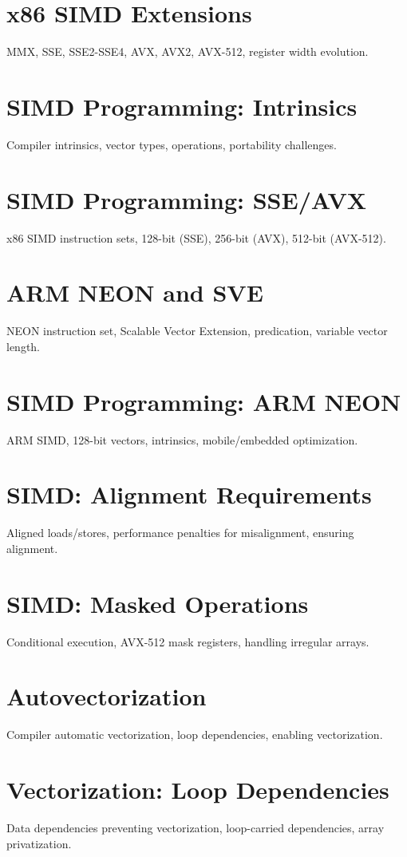 \chapter{x86 SIMD Extensions}
MMX, SSE, SSE2-SSE4, AVX, AVX2, AVX-512, register width evolution.

\chapter{SIMD Programming: Intrinsics}
Compiler intrinsics, vector types, operations, portability challenges.

\chapter{SIMD Programming: SSE/AVX}
x86 SIMD instruction sets, 128-bit (SSE), 256-bit (AVX), 512-bit (AVX-512).

\chapter{ARM NEON and SVE}
NEON instruction set, Scalable Vector Extension, predication, variable vector length.

\chapter{SIMD Programming: ARM NEON}
ARM SIMD, 128-bit vectors, intrinsics, mobile/embedded optimization.

\chapter{SIMD: Alignment Requirements}
Aligned loads/stores, performance penalties for misalignment, ensuring alignment.

\chapter{SIMD: Masked Operations}
Conditional execution, AVX-512 mask registers, handling irregular arrays.

\chapter{Autovectorization}
Compiler automatic vectorization, loop dependencies, enabling vectorization.

\chapter{Vectorization: Loop Dependencies}
Data dependencies preventing vectorization, loop-carried dependencies, array privatization.

